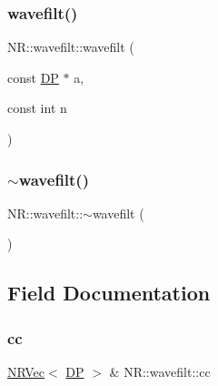 \subsubsection{\texorpdfstring{wavefilt()}{wavefilt()}\hspace{0.1cm}{\footnotesize\ttfamily [3/3]}}
{\footnotesize\ttfamily N\+R\+::wavefilt\+::wavefilt (\begin{DoxyParamCaption}\item[{const \mbox{\hyperlink{namespaceNR_af6ff762dd605ff477b8e52387253a02a}{DP}} $\ast$}]{a,  }\item[{const int}]{n }\end{DoxyParamCaption})\hspace{0.3cm}{\ttfamily [inline]}}

\mbox{\label{classNR_1_1wavefilt_a9d223dd0fb637f3f511510b5efd9c6f6}} 
\subsubsection{\texorpdfstring{$\sim$wavefilt()}{~wavefilt()}\hspace{0.1cm}{\footnotesize\ttfamily [3/3]}}
{\footnotesize\ttfamily N\+R\+::wavefilt\+::$\sim$wavefilt (\begin{DoxyParamCaption}{ }\end{DoxyParamCaption})\hspace{0.3cm}{\ttfamily [inline]}}



\subsection{Field Documentation}
\mbox{\label{classNR_1_1wavefilt_aa4d0e1e40a8f4ea6f18f244241cca8d1}} 
\subsubsection{\texorpdfstring{cc}{cc}}
{\footnotesize\ttfamily \mbox{\hyperlink{classNR_1_1NRVec}{N\+R\+Vec}}$<$ \mbox{\hyperlink{namespaceNR_af6ff762dd605ff477b8e52387253a02a}{DP}} $>$ \& N\+R\+::wavefilt\+::cc}

\mbox{\label{classNR_1_1wavefilt_a57c5c653f23d5591340255ee4fe80c3a}} 
